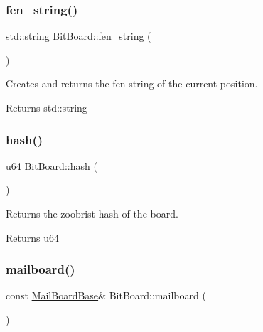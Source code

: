 \subsubsection{\texorpdfstring{fen\+\_\+string()}{fen\_string()}}
{\footnotesize\ttfamily std\+::string Bit\+Board\+::fen\+\_\+string (\begin{DoxyParamCaption}{ }\end{DoxyParamCaption})\hspace{0.3cm}{\ttfamily [inline]}}



Creates and returns the fen string of the current position. 

\begin{DoxyReturn}{Returns}
std\+::string 
\end{DoxyReturn}
\mbox{\label{classBitBoard_a0f58ac22e78e0045776e2ff0d6401d8e}} 
\subsubsection{\texorpdfstring{hash()}{hash()}}
{\footnotesize\ttfamily u64 Bit\+Board\+::hash (\begin{DoxyParamCaption}{ }\end{DoxyParamCaption})\hspace{0.3cm}{\ttfamily [inline]}}



Returns the zoobrist hash of the board. 

\begin{DoxyReturn}{Returns}
u64 
\end{DoxyReturn}
\mbox{\label{classBitBoard_a5397163febc786ddb7d9a324f37136da}} 
\subsubsection{\texorpdfstring{mailboard()}{mailboard()}}
{\footnotesize\ttfamily const \hyperlink{structMailBoardBase}{Mail\+Board\+Base}\& Bit\+Board\+::mailboard (\begin{DoxyParamCaption}{ }\end{DoxyParamCaption})\hspace{0.3cm}{\ttfamily [inline]}}




